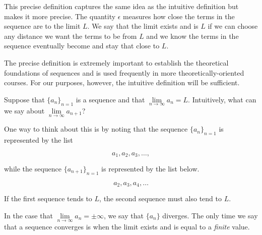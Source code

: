 \documentclass{ximera}
\begin{document}
This precise definition captures the same idea as the intuitive definition but makes it more precise.  The quantity $\epsilon$ measures how close the terms in the sequence are to the limit $L$.  We say that the limit exists and is $L$ if we can choose any distance we want the terms to be from $L$ and we know the terms in the sequence eventually become and stay that close to $L$.  

\begin{remark}
The precise definition is extremely important to establish the theoretical foundations of sequences and is used frequently in more theoretically-oriented courses.  For our purposes, however, the intuitive definition will be sufficient.
\end{remark}

\begin{question}
Suppose that $\{a_n\}_{n=1}$ is a sequence and that $\lim\limits_{n \to \infty} a_n = L$.  Intuitively, what can we say about $\lim\limits_{n \to \infty} a_{n+1}$? 


\begin{multipleChoice}
\end{multipleChoice}




One way to think about this is by noting that the sequence $\{a_n\}_{n=1}$ is represented by the list

\[
a_1,a_2,a_3, \ldots ,
\]

while the sequence $\{a_{n+1}\}_{n=1}$ is represented by the list below.

\[
a_2,a_3,a_4, \ldots
\]

If the first sequence tends to $L$, the second sequence must also tend to $L$.

\end{question}




\begin{warning}
  In the case that $\lim\limits_{n \to \infty} a_n = \pm\infty$, we say that
  $\{a_n\}$ diverges.  The only time we say that a sequence converges
    is when the limit exists and is equal to a \textit{finite} value.
\end{warning}

\end{document}
